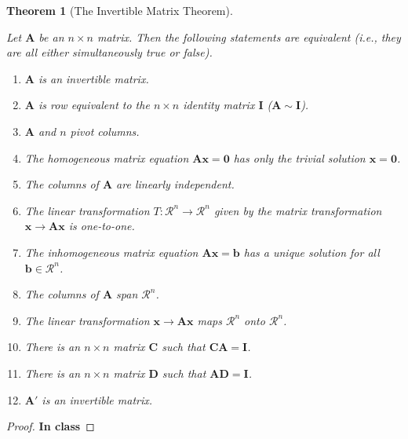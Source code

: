 \documentclass[
]{book}
\newtheorem{theorem}{Theorem}[chapter]
\theoremstyle{definition}
\theoremstyle{definition}
\theoremstyle{definition}
\theoremstyle{remark}
\begin{document}
\begin{theorem}[The Invertible Matrix Theorem]
\protect\hypertarget{thm:invertible-matrix}{}\label{thm:invertible-matrix}

Let \(\mathbf{A}\) be an \(n \times n\) matrix. Then the following statements are equivalent (i.e., they are all either simultaneously true or false).

\begin{enumerate}
\def\labelenumi{\arabic{enumi})}
\item
  \(\mathbf{A}\) is an invertible matrix.
\item
  \(\mathbf{A}\) is row equivalent to the \(n \times n\) identity matrix \(\mathbf{I}\) (\(\mathbf{A} \sim \mathbf{I}\)).
\item
  \(\mathbf{A}\) and \(n\) pivot columns.
\item
  The homogeneous matrix equation \(\mathbf{A} \mathbf{x} = \mathbf{0}\) has only the trivial solution \(\mathbf{x} = \mathbf{0}\).
\item
  The columns of \(\mathbf{A}\) are linearly independent.
\item
  The linear transformation \(T:\mathcal{R}^n \rightarrow \mathcal{R}^n\) given by the matrix transformation \(\mathbf{x} \rightarrow \mathbf{A}\mathbf{x}\) is one-to-one.
\item
  The inhomogeneous matrix equation \(\mathbf{A} \mathbf{x} = \mathbf{b}\) has a unique solution for all \(\mathbf{b} \in \mathcal{R}^n\).
\item
  The columns of \(\mathbf{A}\) span \(\mathcal{R}^n\).
\item
  The linear transformation \(\mathbf{x} \rightarrow \mathbf{A} \mathbf{x}\) maps \(\mathcal{R}^n\) onto \(\mathcal{R}^n\).
\item
  There is an \(n \times n\) matrix \(\mathbf{C}\) such that \(\mathbf{C}\mathbf{A} = \mathbf{I}\).
\item
  There is an \(n \times n\) matrix \(\mathbf{D}\) such that \(\mathbf{A}\mathbf{D} = \mathbf{I}\).
\item
  \(\mathbf{A}'\) is an invertible matrix.
\end{enumerate}

\end{theorem}

\begin{proof}

\textbf{In class}

\end{proof}
\end{document}
